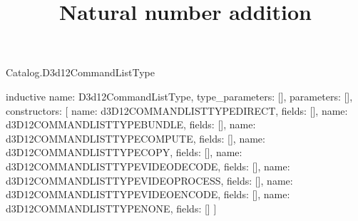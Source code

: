 \begin{lexlean}{Catalog.D3d12CommandListType}
\title{Natural number addition}
\begin{semanticmodule}
inductive{
  name: D3d12CommandListType,
  type_parameters: [],
  parameters: [],
  constructors: [
    {name: d3D12COMMANDLISTTYPEDIRECT, fields: []},
    {name: d3D12COMMANDLISTTYPEBUNDLE, fields: []},
    {name: d3D12COMMANDLISTTYPECOMPUTE, fields: []},
    {name: d3D12COMMANDLISTTYPECOPY, fields: []},
    {name: d3D12COMMANDLISTTYPEVIDEODECODE, fields: []},
    {name: d3D12COMMANDLISTTYPEVIDEOPROCESS, fields: []},
    {name: d3D12COMMANDLISTTYPEVIDEOENCODE, fields: []},
    {name: d3D12COMMANDLISTTYPENONE, fields: []}
  ]
}
\end{semanticmodule}
\end{lexlean}
